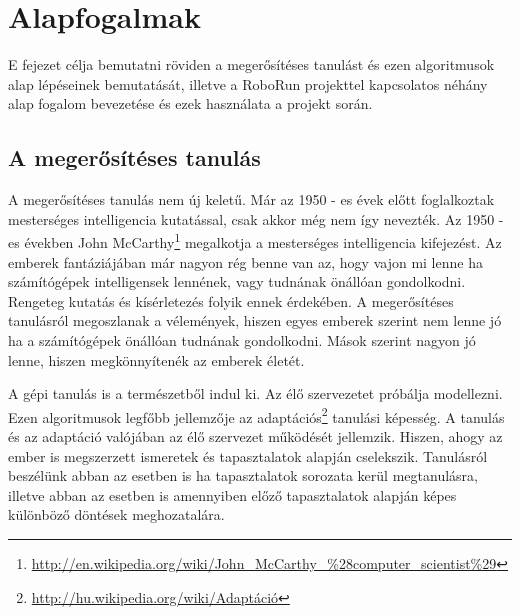 \chapter{Alapfogalmak}\label{ch:ALAPFOGALMAK}

\begin{osszefoglal}
	E fejezet célja bemutatni röviden a megerősítéses tanulást és ezen algoritmusok alap lépéseinek bemutatását, illetve a RoboRun projekttel kapcsolatos néhány alap fogalom bevezetése és ezek használata a projekt során.
\end{osszefoglal}

\section{A megerősítéses tanulás}\label{sec:MEGEROSITESESTANULAS}
A megerősítéses tanulás nem új keletű. Már az 1950 - es évek előtt foglalkoztak mesterséges intelligencia kutatással, csak akkor még nem így nevezték. Az 1950 - es években John McCarthy\footnote{\href {http://en.wikipedia.org/wiki/John\_McCarthy\_\%28computer\_scientist\%29}{http://en.wikipedia.org/wiki/John\_McCarthy\_\%28computer\_scientist\%29}} megalkotja a mesterséges intelligencia kifejezést. Az emberek fantáziájában már nagyon rég benne van az, hogy vajon mi lenne ha számítógépek intelligensek lennének, vagy tudnának önállóan gondolkodni. Rengeteg kutatás és kísérletezés folyik ennek érdekében. A megerősítéses tanulásról megoszlanak a vélemények, hiszen egyes emberek szerint nem lenne jó ha a számítógépek önállóan tudnának gondolkodni. Mások szerint nagyon jó lenne, hiszen megkönnyítenék az emberek életét.

A gépi tanulás is a természetből indul ki. Az élő szervezetet próbálja modellezni. Ezen algoritmusok legfőbb jellemzője az adaptációs\footnote{\href {http://hu.wikipedia.org/wiki/Adaptáció}{http://hu.wikipedia.org/wiki/Adaptáció}} tanulási képesség. A tanulás és az adaptáció valójában az élő szervezet működését jellemzik. Hiszen, ahogy az ember is megszerzett ismeretek és tapasztalatok alapján cselekszik. Tanulásról beszélünk abban az esetben is ha tapasztalatok sorozata kerül megtanulásra, illetve abban az esetben is amennyiben előző tapasztalatok alapján képes különböző döntések meghozatalára. 

